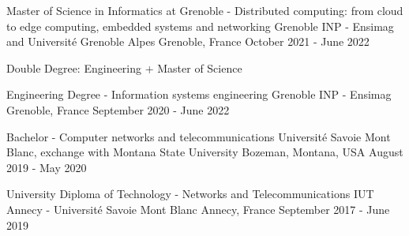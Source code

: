 

\begin{cventries}

\cventry
{Master of Science in Informatics at Grenoble - Distributed computing: from cloud to edge computing, embedded systems and networking} %
{Grenoble INP - Ensimag and Université Grenoble Alpes} %
{Grenoble, France} %
{October 2021 - June 2022} %
{
  \begin{cvitems}
    \item Double Degree: Engineering + Master of Science
  \end{cvitems}
}

\cventry
{Engineering Degree - Information systems engineering} %
{Grenoble INP - Ensimag} %
{Grenoble, France} %
{September 2020 - June 2022} %
{
}

\cventry
{Bachelor - Computer networks and telecommunications} %
{Université Savoie Mont Blanc, exchange with Montana State University} %
{Bozeman, Montana, USA} %
{August 2019 - May 2020} %
{
}

\cventry
{University Diploma of Technology - Networks and Telecommunications} %
{IUT Annecy - Université Savoie Mont Blanc} %
{Annecy, France} %
{September 2017 - June 2019} %
{
}






\end{cventries}
